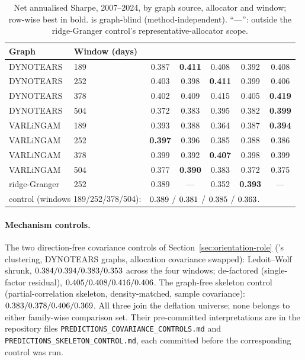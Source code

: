 \begin{table}[h]
  \centering
  \caption{Net annualised Sharpe, 2007--2024, by graph source, allocator and
    window; row-wise best in bold. \HRP{} is graph-blind
    (method-independent). ``---'': outside the ridge-Granger control's
    representative-allocator scope.}
  \label{tab:matrix-full}
  \small
  \setlength{\tabcolsep}{4.5pt}
  \begin{tabular}{l l c c c c c}
    \toprule
    Graph & Window (days) & \skelsamp{} & \skelalt{} & \skelsem{} & \orientsamp{} & \orientsem{} \\
    \midrule
    DYNOTEARS & 189 & 0.387 & \textbf{0.411} & 0.408 & 0.392 & 0.408 \\
    DYNOTEARS & 252 & 0.403 & 0.398 & \textbf{0.411} & 0.399 & 0.406 \\
    DYNOTEARS & 378 & 0.402 & 0.409 & 0.415 & 0.405 & \textbf{0.419} \\
    DYNOTEARS & 504 & 0.372 & 0.383 & 0.395 & 0.382 & \textbf{0.399} \\
    VARLiNGAM & 189 & 0.393 & 0.388 & 0.364 & 0.387 & \textbf{0.394} \\
    VARLiNGAM & 252 & \textbf{0.397} & 0.396 & 0.385 & 0.388 & 0.386 \\
    VARLiNGAM & 378 & 0.399 & 0.392 & \textbf{0.407} & 0.398 & 0.399 \\
    VARLiNGAM & 504 & 0.377 & \textbf{0.390} & 0.383 & 0.372 & 0.375 \\
    ridge-Granger   & 252 & 0.389 & --- & 0.352 & \textbf{0.393} & --- \\
    \midrule
    \multicolumn{2}{l}{\HRP{} control (windows 189/252/378/504):} &
    \multicolumn{5}{l}{$0.389$ / $0.381$ /
      $0.385$ / $0.363$.} \\
    \bottomrule
  \end{tabular}
\end{table}

\paragraph{Mechanism controls.} The two direction-free covariance
controls of Section~\ref{sec:orientation-role} (\skelsamp{}'s clustering,
DYNOTEARS graphs, allocation covariance swapped): Ledoit--Wolf shrunk,
$0.384/0.394/0.383/0.353$
across the four windows; de-factored (single-factor residual),
$0.405/0.408/0.416/0.406$.
The graph-free skeleton control (partial-correlation skeleton,
density-matched, sample covariance):
$0.383/0.378/0.406/0.369$.
All three join the deflation universe; none belongs to either
family-wise
comparison set. Their pre-committed interpretations are in the
repository files \texttt{PREDICTIONS\_COVARIANCE\_CONTROLS.md} and
\texttt{PREDICTIONS\_SKELETON\_CONTROL.md}, each committed
before the corresponding control was run.

